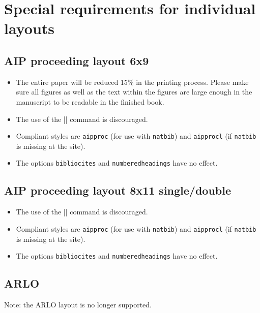 \section{Special requirements for individual layouts}

\subsection{AIP proceeding layout 6x9}

\begin{itemize}
\raggedright
\item
 The entire paper will be reduced 15\% in the printing process. Please
 make sure all figures as well as the text within the figures are
 large enough in the manuscript to be readable in the finished book.
\item
 The use of the |\source| command is discouraged.
\item
 Compliant \BibTeX{} styles are \texttt{aipproc} (for use with
 \texttt{natbib}) and  \texttt{aipprocl} (if \texttt{natbib} is
 missing at the site).
\item
 The options \texttt{bibliocites} and \texttt{numberedheadings} have
 no effect.
\end{itemize}

\subsection{AIP proceeding layout 8x11 single/double}

\begin{itemize}
\raggedright
\item
 The use of the |\source| command is discouraged.
\item
 Compliant \BibTeX{} styles are \texttt{aipproc} (for use with
 \texttt{natbib}) and  \texttt{aipprocl} (if \texttt{natbib} is
 missing at the site).
\item
 The options \texttt{bibliocites} and \texttt{numberedheadings} have
 no effect.
\end{itemize}

\subsection{ARLO}

Note: the ARLO layout is no longer supported.

